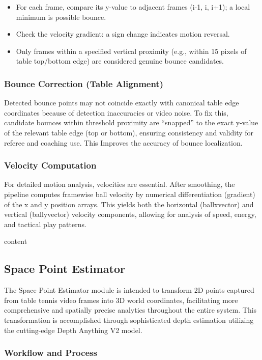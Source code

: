 \documentclass[conference]{IEEEtran}
\begin{document}
\begin{itemize}
    \item For each frame, compare its y-value to adjacent frames (i-1, i, i+1); a local minimum is possible bounce.
    \item Check the velocity gradient: a sign change indicates motion reversal.
    \item Only frames within a specified vertical proximity (e.g., within 15 pixels of table top/bottom edge) are considered genuine bounce candidates.
\end{itemize}

\subsubsection{Bounce Correction (Table Alignment)}
Detected bounce points may not coincide exactly with canonical table edge coordinates because of detection inaccuracies or video noise. To fix this, candidate bounces within threshold proximity are “snapped” to the exact y-value of the relevant table edge (top or bottom), ensuring consistency and validity for referee and coaching use. This Improves the accuracy of bounce localization.

\subsubsection{Velocity Computation}
For detailed motion analysis, velocities are essential. After smoothing, the pipeline computes framewise ball velocity by numerical differentiation (gradient) of the x and y position arrays. This yields both the horizontal (ballxvector) and vertical (ballyvector) velocity components, allowing for analysis of speed, energy, and tactical play patterns.


content
\subsection{Space Point Estimator}

The Space Point Estimator module is intended to transform 2D points captured from table tennis video frames into 3D world coordinates, facilitating more comprehensive and spatially precise analytics throughout the entire system. This transformation is accomplished through sophisticated depth estimation utilizing the cutting-edge Depth Anything V2 model.

\subsubsection{Workflow and Process}
\end{document}
